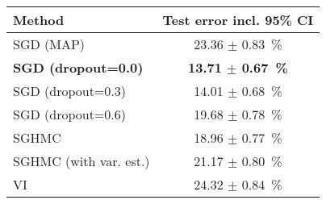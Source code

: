 \begin{tabular}{lc}
\toprule
                    Method &     Test error incl. 95\% CI \\
\midrule
                 SGD (MAP) &          23.36 $\pm$ 0.83~\% \\
\textbf{SGD (dropout=0.0)} & \textbf{13.71 $\pm$ 0.67~\%} \\
         SGD (dropout=0.3) &          14.01 $\pm$ 0.68~\% \\
         SGD (dropout=0.6) &          19.68 $\pm$ 0.78~\% \\
                     SGHMC &          18.96 $\pm$ 0.77~\% \\
    SGHMC (with var. est.) &          21.17 $\pm$ 0.80~\% \\
                        VI &          24.32 $\pm$ 0.84~\% \\
\bottomrule
\end{tabular}
